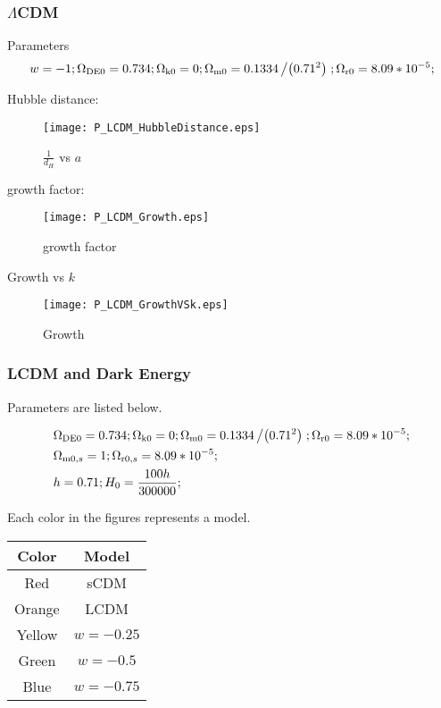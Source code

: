 \subsubsection{$\Lambda$CDM}

Parameters
\begin{eqnarray*}
w=-1;\Omega _{\text{DE0}}=0.734;\Omega _{\text{k0}}=0;\Omega _{\text{m0}}=0.1334\left/\left(0.71^2\right)\right.;\Omega _{\text{r0}}=8.09*10^{-5};
\end{eqnarray*}

Hubble distance:
\begin{figure}[!htbp]
\centering
\texttt{[image: P\_LCDM\_HubbleDistance.eps]}
\caption{$\frac{1}{d_H}$ vs $a$}
\end{figure}

growth factor:
\begin{figure}[!htbp]
\centering
\texttt{[image: P\_LCDM\_Growth.eps]}
\caption{growth factor}
\end{figure}

Growth vs $k$
\begin{figure}[!htbp]
\centering
\texttt{[image: P\_LCDM\_GrowthVSk.eps]}
\caption{Growth}
\end{figure}




\subsubsection{LCDM and Dark Energy}

Parameters are listed below.

\begin{eqnarray}
&\Omega _{\text{DE0}}=0.734;\Omega _{\text{k0}}=0;\Omega _{\text{m0}}=0.1334\left/\left(0.71^2\right)\right.;
\Omega _{\text{r0}}=8.09*10^{-5};
\\
&\Omega _{\text{m0},s}=1;\Omega _{\text{r0},s}=8.09*10^{-5};\\
&h=0.71;H_0=\frac{100 h}{300000};
\end{eqnarray}

Each color in the figures represents a model.
\vspace{2ex}
\begin{center}
\begin{tabular}{|c|c|}\hline
{\bf Color} & {\bf Model} \\\hline
Red & sCDM \\\hline
Orange & LCDM \\\hline
Yellow & $w=-0.25$ \\ \hline
Green &  $w=-0.5$ \\ \hline
Blue & $w=-0.75$ \\ \hline
\end{tabular}
\end{center}
\vspace{2ex}





